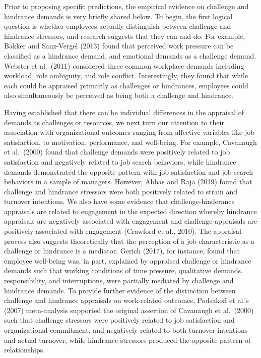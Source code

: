 \documentclass[
  man]{apa6}
\begin{document}
Prior to proposing specific predictions, the empirical evidence on challenge and hindrance demands is very briefly shared below. To begin, the first logical question is whether employees actually distinguish between challenge and hindrance stressors, and research suggests that they can and do. For example, Bakker and Sanz-Vergel (2013) found that perceived work pressure can be classified as a hindrance demand, and emotional demands as a challenge demand. Webster et al.~(2011) considered three common workplace demands including workload, role ambiguity, and role conflict. Interestingly, they found that while each could be appraised primarily as challenges or hindrances, employees could also simultaneously be perceived as being both a challenge and hindrance.

Having established that there can be individual differences in the appraisal of demands as challenges or resources, we next turn our attention to their association with organizational outcomes ranging from affective variables like job satisfaction, to motivation, performance, and well-being. For example, Cavanaugh et al.~(2000) found that challenge demands were positively related to job satisfaction and negatively related to job search behaviors, while hindrance demands demonstrated the opposite pattern with job satisfaction and job search behaviors in a sample of managers. However, Abbas and Raja (2019) found that challenge and hindrance stressors were both positively related to strain and turnover intentions. We also have some evidence that challenge-hinderance appraisals are related to engagement in the expected direction whereby hindrance appraisals are negatively associated with engagement and challenge appraisals are positively associated with engagement (Crawford et al., 2010). The appraisal process also suggests theoretically that the perception of a job characteristic as a challenge or hindrance is a mediator. Gerich (2017), for instance, found that employee well-being was, in part, explained by appraised challenge or hindrance demands such that working conditions of time pressure, qualitative demands, responsibility, and interruptions, were partially mediated by challenge and hindrance demands. To provide further evidence of the distinction between challenge and hindrance appraisals on work-related outcomes, Podsakoff et al.'s (2007) meta-analysis supported the original assertion of Cavanaugh et al.~(2000) such that challenge stressors were positively related to job satisfaction and organizational commitment, and negatively related to both turnover intentions and actual turnover, while hindrance stressors produced the opposite pattern of relationships.
\end{document}
